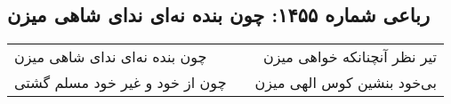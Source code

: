 \begin{center}
\section*{رباعی شماره ۱۴۵۵: چون بنده نه‌ای ندای شاهی میزن}
\label{sec:1455}
\begin{longtable}{l p{0.5cm} r}
چون بنده نه‌ای ندای شاهی میزن
&&
تیر نظر آنچنانکه خواهی میزن
\\
چون از خود و غیر خود مسلم گشتی
&&
بی‌خود بنشین کوس الهی میزن
\\
\end{longtable}
\end{center}
